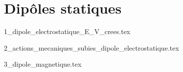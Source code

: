 \chapter{Dipôles statiques}

\minitoc

{1_dipole_electrostatique_E_V_crees.tex}

{2_actions_mecaniques_subies_dipole_electrostatique.tex}

{3_dipole_magnetique.tex}